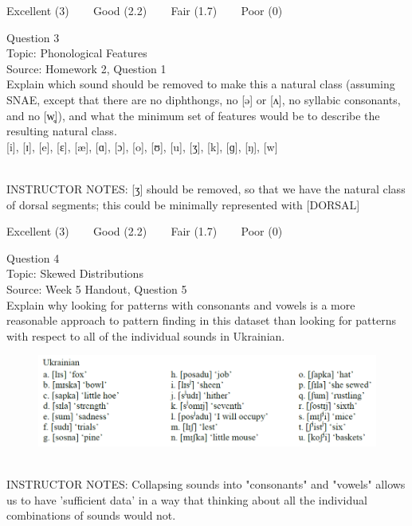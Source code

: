 \documentclass[12pt]{article}
\begin{document}
\vfill
Excellent (3) ~~~ Good (2.2) ~~~ Fair (1.7) ~~~ Poor (0)
\newpage

{\large Question 3}\\

Topic: Phonological Features\\
Source: Homework 2, Question 1\\

Explain which sound should be removed to make this a natural class (assuming SNAE, except that there are no diphthongs, no [ə] or [ʌ], no syllabic consonants, and no [w̥]), and what the minimum set of features would be to describe the resulting natural class.\\

{[i]}, {[ɪ]}, {[e]}, {[ɛ]}, {[æ]}, {[ɑ]}, {[ɔ]}, {[o]}, {[ʊ]}, {[u]}, {[ʒ]}, {[k]}, {[ɡ]}, {[ŋ]}, {[w]}


~\\
INSTRUCTOR NOTES: [ʒ] should be removed, so that we have the natural class of dorsal segments; this could be minimally represented with [DORSAL]


\vfill
Excellent (3) ~~~ Good (2.2) ~~~ Fair (1.7) ~~~ Poor (0)
\newpage

{\large Question 4}\\

Topic: Skewed Distributions\\
Source: Week 5 Handout, Question 5\\

Explain why looking for patterns with consonants and vowels is a more reasonable approach to pattern finding in this dataset than looking for patterns with respect to all of the individual sounds in Ukrainian.\\

\begin{figure}[H]
\includegraphics{../images/ukrainian.png}
\end{figure}

~\\
INSTRUCTOR NOTES: Collapsing sounds into "consonants" and "vowels" allows us to have 'sufficient data' in a way that thinking about all the individual combinations of sounds would not.
\end{document}
